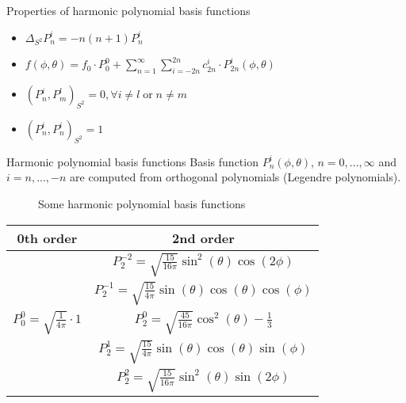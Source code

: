 
\begin{frame}{Properties of harmonic polynomial basis functions}
	\begin{itemize}
		\item $\Delta_{S^2}P^i_n = -n(n+1) P^i_n$
		\vspace{12pt}
		\item $	f(\phi, \theta) = f_0 \cdot P_0^0 + \sum_{n=1}^{\infty} \sum_{i=-2n}^{2n} c^i_{2n} \cdot P^i_{2n}(\phi, \theta)$
		\vspace{12pt}
		\item $(P^i_n, P^l_m)_{S^2} = 0, \forall i \neq l \; \text{or} \; n \neq m$
		\vspace{12pt}
		\item $	(P^i_n, P^i_n)_{S^2} = 1$
	\end{itemize}
\end{frame}

\begin{frame}{Harmonic polynomial basis functions}
	\scriptsize
	Basis function ${P}^{i}_{n}(\phi, \theta)$, $n = 0, ..., \infty$ and $i = n, ..., -n$ are computed from orthogonal polynomials (Legendre polynomials). 
	\vspace{20pt}
	\begin{figure}
		\centering
		\qquad
		\qquad
		\qquad
		\caption{Some harmonic polynomial basis functions}
	\end{figure}

	\begin{minipage}[b]{0.4\textwidth}
		\begin{table}[H]
			\tiny
			\begin{tabular}{|c|c|}
				\hline
				0th order & 2nd order \\
				\hline
				& $P^{-2}_2 = \sqrt{\frac{15}{16\pi}}\sin^2(\theta)\cos(2\phi)$ \\
				& $P^{-1}_2 = \sqrt{\frac{15}{4\pi}}\sin(\theta)\cos(\theta)\cos(\phi)$ \\
				$P^0_0 = \sqrt{\frac{1}{4\pi}} \cdot 1$ & $P^0_2 = \sqrt{\frac{45}{16\pi}}\cos^2(\theta) - \frac{1}{3}$ \\
				& $P^1_2 = \sqrt{\frac{15}{4\pi}}\sin(\theta)\cos(\theta)\sin(\phi)$\\
				& $P^2_2 = \sqrt{\frac{15}{16\pi}}\sin^2(\theta)\sin(2\phi)$\\
				\hline
			\end{tabular}
		\end{table}
	\end{minipage}
\end{frame}


